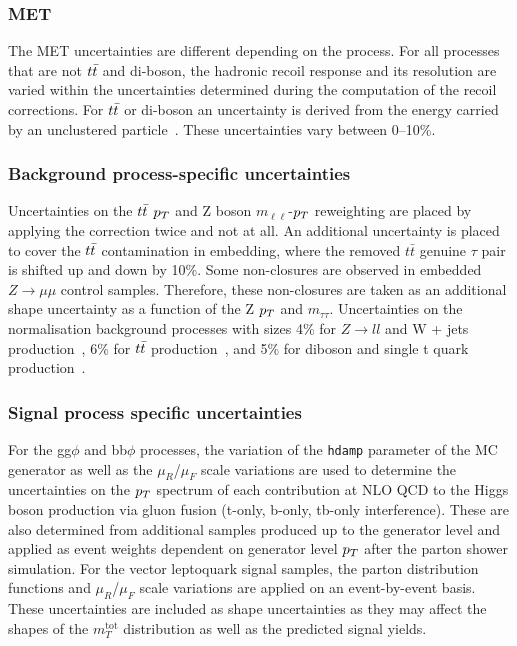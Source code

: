 \subsubsection{MET}
The \ac{MET} uncertainties are different depending on the process.
For all processes that are not $t\bar{t}$ and di-boson, the hadronic recoil response and its resolution are varied within the uncertainties determined during the computation of the recoil corrections.
For $t\bar{t}$ or di-boson an uncertainty is derived from the energy carried by an unclustered particle~\cite{Sirunyan:2019kia}.
These uncertainties vary between 0--10\%.

\subsubsection{Background process-specific uncertainties}
Uncertainties on the $t\bar{t}$ $p_{T}$ and Z boson $m_{\ell\ell}$-$p_{T}$ reweighting are placed by applying the correction twice and not at all.
An additional uncertainty is placed to cover the $t\bar{t}$ contamination in embedding, where the removed $t\bar{t}$ genuine $\tau$ pair is shifted up and down by 10\%.
Some non-closures are observed in embedded $Z\to\mu\mu$ control samples. 
Therefore, these non-closures are taken as an additional shape uncertainty as a function of the Z $p_{T}$ and $m_{\tau\tau}$.
Uncertainties on the normalisation background processes with sizes 4\% for $Z\rightarrow ll$ and W + jets production~\cite{Melnikov:2006kv}, 6\% for $t\bar{t}$ production~\cite{Czakon:2011xx,Kidonakis:2013zqa}, and 5\% for diboson and single t quark production~\cite{Kidonakis:2013zqa,Campbell:2011bn,Gehrmann:2014fva}.

\subsubsection{Signal process specific uncertainties}
For the gg$\phi$ and bb$\phi$ processes, the variation of the \texttt{hdamp} parameter of the \POWHEG \ac{MC} generator as well as the $\mu_{R}$/$\mu_{F}$ scale variations are used to determine the uncertainties on the $p_{T}$ spectrum of each contribution at NLO QCD to the Higgs boson production via gluon fusion (t-only, b-only, tb-only interference). 
These are also determined from additional samples produced up to the generator level and applied as event weights dependent on generator level $p_{T}$ after the parton shower simulation.
For the vector leptoquark signal samples, the parton distribution functions and $\mu_{R}$/$\mu_{F}$ scale variations are applied on an event-by-event basis.
These uncertainties are included as shape uncertainties as they may affect the shapes of the $m_{T}^{\text{tot}}$ distribution as well as the predicted signal yields.

